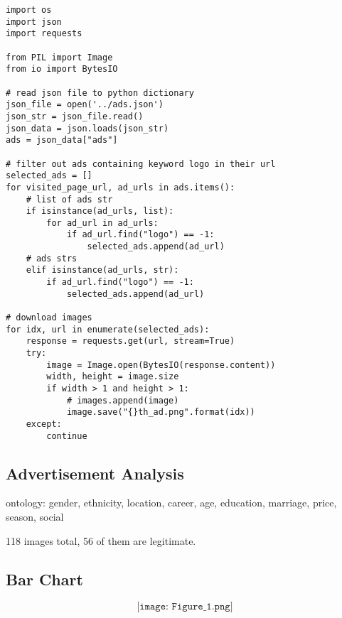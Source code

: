 \documentclass[12pt]{article}%
\begin{document}
\begin{lstlisting}
import os
import json
import requests

from PIL import Image
from io import BytesIO

# read json file to python dictionary
json_file = open('../ads.json')
json_str = json_file.read()
json_data = json.loads(json_str)
ads = json_data["ads"]

# filter out ads containing keyword logo in their url
selected_ads = []
for visited_page_url, ad_urls in ads.items():
    # list of ads str
    if isinstance(ad_urls, list):
        for ad_url in ad_urls:
            if ad_url.find("logo") == -1:
                selected_ads.append(ad_url)
    # ads strs
    elif isinstance(ad_urls, str):
        if ad_url.find("logo") == -1:
            selected_ads.append(ad_url)

# download images
for idx, url in enumerate(selected_ads):
    response = requests.get(url, stream=True)
    try:
        image = Image.open(BytesIO(response.content))
        width, height = image.size
        if width > 1 and height > 1:
            # images.append(image)
            image.save("{}th_ad.png".format(idx))
    except:
        continue
\end{lstlisting}


\subsection{Advertisement Analysis}

ontology: gender, ethnicity, location, career, age, education, marriage, price, season, social

118 images total, 56 of them are legitimate.


\subsection{Bar Chart}

\[
\texttt{[image: Figure\_1.png]}
\]
\end{document}

